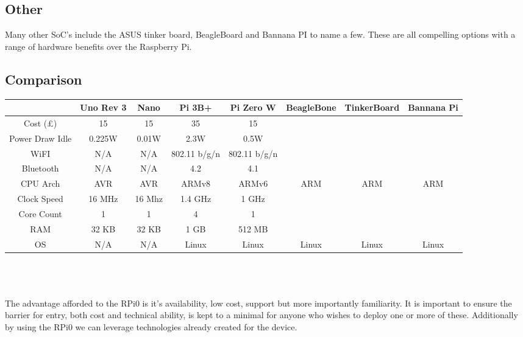 \subsection{Other}
Many other SoC’s include the ASUS tinker board, BeagleBoard and Bannana PI to name a few. These are all compelling options with a range of hardware benefits over the Raspberry Pi. 

\subsection{Comparison}

\hspace{-3cm}
\begin{tabular}{cccccccc}
	\hline 
	{} & Uno Rev 3 & Nano & Pi 3B+ & Pi Zero W & BeagleBone & TinkerBoard & Bannana Pi \\ 
	\hline 
	Cost (£) & 15 & 15 & 35 & 15 &  &  &  \\ 
	Power Draw Idle & 0.225W & 0.01W & 2.3W & 0.5W &  &  &  \\ 
	WiFI & N/A & N/A & 802.11 b/g/n & 802.11 b/g/n &  &  &  \\ 
	Bluetooth & N/A & N/A & 4.2 & 4.1 &  &  &  \\ 
	CPU Arch & AVR & AVR & ARMv8 & ARMv6 & ARM & ARM & ARM \\ 
	Clock Speed & 16 MHz & 16 Mhz & 1.4 GHz & 1 GHz &  &  &  \\ 
	Core Count & 1 & 1 & 4 & 1 &  &  &  \\ 
	RAM & 32 KB & 32 KB & 1 GB & 512 MB &  &  &  \\ 
	OS & N/A & N/A & Linux & Linux & Linux & Linux & Linux \\ 
	\hline 
\end{tabular}
\\\\\\
The advantage afforded to the RPi0 is it’s availability, low cost, support but more importantly familiarity. It is important to ensure the barrier for entry, both cost and technical ability, is kept to a minimal for anyone who wishes to deploy one or more of these. Additionally by using the RPi0 we can leverage technologies already created for the device. 